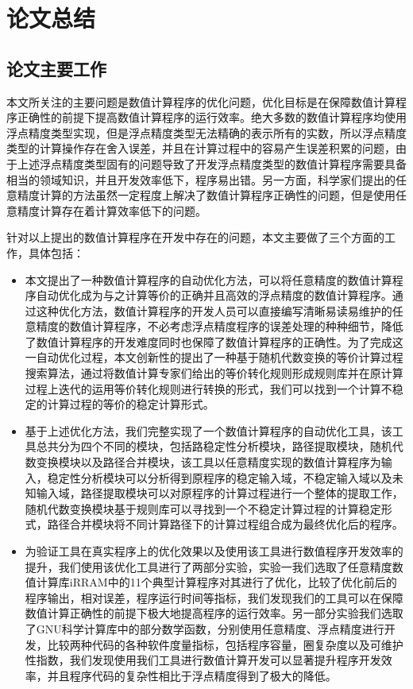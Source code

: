 \chapter{论文总结}\label{chapter_concludes}

\section{论文主要工作}

本文所关注的主要问题是数值计算程序的优化问题，优化目标是在保障数值计算程序正确性的前提下提高数值计算程序的运行效率。绝大多数的数值计算程序均使用浮点精度类型实现，但是浮点精度类型无法精确的表示所有的实数，所以浮点精度类型的计算操作存在舍入误差，并且在计算过程中的容易产生误差积累的问题，由于上述浮点精度类型固有的问题导致了开发浮点精度类型的数值计算程序需要具备相当的领域知识，并且开发效率低下，程序易出错。另一方面，科学家们提出的任意精度计算的方法虽然一定程度上解决了数值计算程序正确性的问题，但是使用任意精度计算存在着计算效率低下的问题。

针对以上提出的数值计算程序在开发中存在的问题，本文主要做了三个方面的工作，具体包括：

\begin{itemize}

    \item 本文提出了一种数值计算程序的自动优化方法，可以将任意精度的数值计算程序自动优化成为与之计算等价的正确并且高效的浮点精度的数值计算程序。通过这种优化方法，数值计算程序的开发人员可以直接编写清晰易读易维护的任意精度的数值计算程序，不必考虑浮点精度程序的误差处理的种种细节，降低了数值计算程序的开发难度同时也保障了数值计算程序的正确性。为了完成这一自动优化过程，本文创新性的提出了一种基于随机代数变换的等价计算过程搜索算法，通过将数值计算专家们给出的等价转化规则形成规则库并在原计算过程上迭代的运用等价转化规则进行转换的形式，我们可以找到一个计算不稳定的计算过程的等价的稳定计算形式。

    \item 基于上述优化方法，我们完整实现了一个数值计算程序的自动优化工具，该工具总共分为四个不同的模块，包括路稳定性分析模块，路径提取模块，随机代数变换模块以及路径合并模块，该工具以任意精度实现的数值计算程序为输入，稳定性分析模块可以分析得到原程序的稳定输入域，不稳定输入域以及未知输入域，路径提取模块可以对原程序的计算过程进行一个整体的提取工作，随机代数变换模块基于规则库可以寻找到一个不稳定计算过程的计算稳定形式，路径合并模块将不同计算路径下的计算过程组合成为最终优化后的程序。

    \item 为验证工具在真实程序上的优化效果以及使用该工具进行数值程序开发效率的提升，我们使用该优化工具进行了两部分实验，实验一我们选取了任意精度数值计算库iRRAM中的11个典型计算程序对其进行了优化，比较了优化前后的程序输出，相对误差，程序运行时间等指标，我们发现我们的工具可以在保障数值计算正确性的前提下极大地提高程序的运行效率。另一部分实验我们选取了GNU科学计算库中的部分数学函数，分别使用任意精度、浮点精度进行开发，比较两种代码的各种软件度量指标，包括程序容量，圈复杂度以及可维护性指数，我们发现使用我们工具进行数值计算开发可以显著提升程序开发效率，并且程序代码的复杂性相比于浮点精度得到了极大的降低。

\end{itemize}

